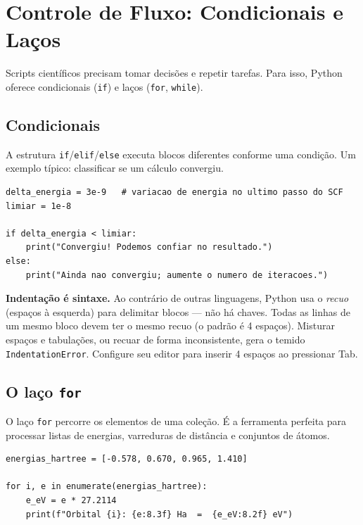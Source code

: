 \documentclass[11pt,a4paper,openany]{book}
\newcommand{\code}[1]{\texttt{#1}}
\newcommand{\python}{\textsf{Python}}
\begin{document}
\section{Controle de Fluxo: Condicionais e Laços}
\label{sec:fluxo}

Scripts científicos precisam tomar decisões e repetir tarefas. Para isso, \python{}
oferece condicionais (\code{if}) e laços (\code{for}, \code{while}).

\subsection{Condicionais}

A estrutura \code{if}/\code{elif}/\code{else} executa blocos diferentes conforme uma
condição. Um exemplo típico: classificar se um cálculo convergiu.

\begin{lstlisting}[style=python,caption={Decisão condicional.},label={lst:if}]
delta_energia = 3e-9   # variacao de energia no ultimo passo do SCF
limiar = 1e-8

if delta_energia < limiar:
    print("Convergiu! Podemos confiar no resultado.")
else:
    print("Ainda nao convergiu; aumente o numero de iteracoes.")
\end{lstlisting}

\begin{caixaatencao}
\textbf{Indentação é sintaxe.} Ao contrário de outras linguagens, \python{} usa o
\emph{recuo} (espaços à esquerda) para delimitar blocos --- não há chaves. Todas
as linhas de um mesmo bloco devem ter o mesmo recuo (o padrão é 4 espaços).
Misturar espaços e tabulações, ou recuar de forma inconsistente, gera o temido
\code{IndentationError}. Configure seu editor para inserir 4 espaços ao pressionar
Tab.
\end{caixaatencao}

\subsection{O laço \code{for}}

O laço \code{for} percorre os elementos de uma coleção. É a ferramenta perfeita para
processar listas de energias, varreduras de distância e conjuntos de átomos.

\begin{lstlisting}[style=python,caption={Percorrendo energias com \code{for}.},label={lst:for}]
energias_hartree = [-0.578, 0.670, 0.965, 1.410]

for i, e in enumerate(energias_hartree):
    e_eV = e * 27.2114
    print(f"Orbital {i}: {e:8.3f} Ha  =  {e_eV:8.2f} eV")
\end{lstlisting}
\end{document}
